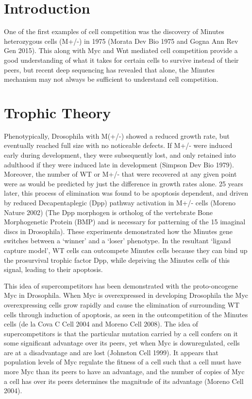 \documentclass[]{book}
\begin{document}
\section{Introduction}\label{introduction-2}

One of the first examples of cell competition was the discovery of
Minutes heterozygous cells (M+/-) in 1975 (Morata Dev Bio 1975 and Gogna
Ann Rev Gen 2015). This along with Myc and Wnt mediated cell competition
provide a good understanding of what it takes for certain cells to
survive instead of their peers, but recent deep sequencing has revealed
that alone, the Minutes mechanism may not always be sufficient to
understand cell competition.

\section{Trophic Theory}\label{trophic-theory}

Phenotypically, Drosophila with M(+/-) showed a reduced growth rate, but
eventually reached full size with no noticeable defects. If M+/- were
induced early during development, they were subsequently lost, and only
retained into adulthood if they were induced late in development
(Simpson Dev Bio 1979). Moreover, the number of WT or M+/- that were
recovered at any given point were as would be predicted by just the
difference in growth rates alone. 25 years later, this process of
elimination was found to be apoptosis dependent, and driven by reduced
Decapentaplegic (Dpp) pathway activation in M+/- cells (Moreno Nature
2002) (The Dpp morphogen is ortholog of the vertebrate Bone
Morphogenetic Protein (BMP) and is necessary for patterning of the 15
imaginal discs in Drosophila). These experiments demonstrated how the
Minutes gene switches between a `winner' and a `loser' phenotype. In the
resultant `ligand capture model', WT cells can outcompete Minutes cells
because they can bind up the prosurvival trophic factor Dpp, while
depriving the Minutes cells of this signal, leading to their apoptosis.

This idea of supercompetitors has been demonstrated with the
proto-oncogene Myc in Drosophila. When Myc is overexpressed in
developing Drosophila the Myc overexpressing cells grow rapidly and
cause the elimination of surrounding WT cells through induction of
apoptosis, as seen in the outcompetition of the Minutes cells (de la
Cova C Cell 2004 and Moreno Cell 2008). The idea of supercompetitors is
that the particular mutation carried by a cell confers on it some
significant advantage over its peers, yet when Myc is downregulated,
cells are at a disadvantage and are lost (Johnston Cell 1999). It
appears that population levels of Myc regulate the fitness of a cell
such that a cell must have more Myc than its peers to have an advantage,
and the number of copies of Myc a cell has over its peers determines the
magnitude of its advantage (Moreno Cell 2004).
\end{document}
